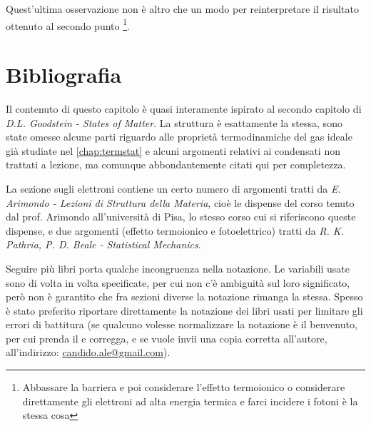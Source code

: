 Quest'ultima osservazione non è altro che un modo per reinterpretare il risultato ottenuto al secondo punto \footnote{Abbassare la barriera e poi considerare l'effetto termoionico o considerare direttamente gli elettroni ad alta energia termica e farci incidere i fotoni è la stessa cosa}.


\section{Bibliografia}

Il contenuto di questo capitolo è quasi interamente ispirato al secondo capitolo di \textit{D.L. Goodstein - States of Matter}. La struttura è esattamente la stessa, sono state omesse alcune parti riguardo alle proprietà termodinamiche del gas ideale già studiate nel \cref{chap:termstat} e alcuni argomenti relativi ai condensati non trattati a lezione, ma comunque abbondantemente citati qui per completezza.

La sezione sugli elettroni contiene un certo numero di argomenti tratti da \textit{E. Arimondo - Lezioni di Struttura della Materia}, cioè le dispense del corso tenuto dal prof. Arimondo all'università di Pisa, lo stesso corso cui si riferiscono queste dispense, e due argomenti (effetto termoionico e fotoelettrico) tratti da \textit{R. K. Pathria, P. D. Beale - Statistical Mechanics}.

Seguire più libri porta qualche incongruenza nella notazione. Le variabili usate sono di volta in volta specificate, per cui non c'è ambiguità sul loro significato, però non è garantito che fra sezioni diverse la notazione rimanga la stessa. Spesso è stato preferito riportare direttamente la notazione dei libri usati per limitare gli errori di battitura (se qualcuno volesse normalizzare la notazione è il benvenuto, per cui prenda il  e corregga, e se vuole invii una copia corretta all'autore, all'indirizzo: \href{mailto:candido.ale@gmail.com}{candido.ale@gmail.com}).
